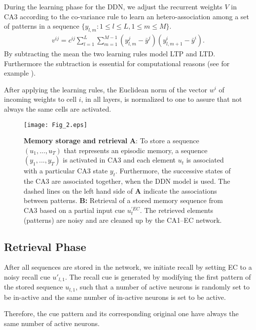 \documentclass[utf8]{frontiersSCNS} %
\begin{document}
During the learning phase for the DDN, we adjust the recurrent weights $V$ in CA3 according to the co-variance rule \cite{sejnowski1977storing} to learn an hetero-association among a set of patterns in a sequence $\{ y_{l, m}: 1\le l \le L, 1\le m \le M\}$.
\begin{align}
	\label{heteroca3Eq}
	v^{ij} =  c^{ij}\sum_{l=1}^L{\sum_{m=1}^{M-1}(y^j_{l, m}  - \bar {y}^j)(y_{l, m+1}^i - \bar{y}^i)}.
\end{align}
By subtracting the mean the two learning rules model LTP and LTD. Furthermore the subtraction is essential for computational reasons (see for example \cite[chapter 8.2]{amit1992modeling}).

After applying the learning rules, the Euclidean norm of the vector $w^i$ of incoming weights to cell $i$, in all layers, is normalized to one to assure that not always the same cells are activated. 

\begin{figure}[!htb]
\centering\texttt{[image: Fig\_2.eps]}
\caption{\textbf{Memory storage and retrieval} \textbf A: To store a sequence $(u_1 , . . . ,u_T)$ that represents an episodic memory, a sequence $(y_1 , . . . ,y_T)$ is activated in CA3 and each element $u_t$ is associated with a particular CA3 state $y_t$. Furthermore, the successive states of the CA3 are associated together, when the DDN model is used. The dashed lines on the left hand side of \textbf{A} indicate the associations between patterns.  
\textbf{B:} Retrieval of a stored memory sequence from CA3 based on a partial input cue $u^{'EC}_t$. The retrieved elements (patterns) are noisy and are cleaned up by the CA1–EC network.}
\label{Fig_2}
\end{figure}

\subsection{Retrieval Phase}
\label{S:4}

After all sequences are stored in the network, we initiate recall by setting EC to a noisy recall cue $u'_{l, 1}$.  The recall cue is generated by modifying the first pattern of the stored sequence $u_{l, 1}$, such that a number of active neurons is randomly set to be in-active and the same number of in-active neurons is set to be active. 

Therefore, the cue pattern and its corresponding original one have always the same number of active neurons. 
\end{document}
